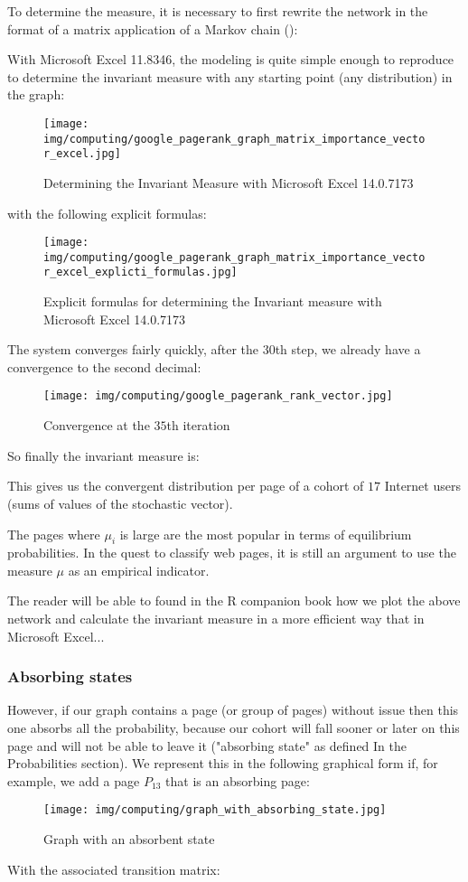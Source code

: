 	To determine the measure, it is necessary to first rewrite the network in the format of a matrix application of a Markov chain ():
	
	With Microsoft Excel 11.8346, the modeling is quite simple enough to reproduce to determine the invariant measure with any starting point (any distribution) in the graph:
	\begin{figure}[H]
		\centering
		\texttt{[image: img/computing/google\_pagerank\_graph\_matrix\_importance\_vector\_excel.jpg]}
		\caption[]{Determining the Invariant Measure with Microsoft Excel 14.0.7173}
	\end{figure}
	with the following explicit formulas:
	\begin{figure}[H]
		\centering
		\texttt{[image: img/computing/google\_pagerank\_graph\_matrix\_importance\_vector\_excel\_explicti\_formulas.jpg]}
		\caption[]{Explicit formulas for determining the Invariant measure with Microsoft Excel 14.0.7173}
	\end{figure}
	The system converges fairly quickly, after the $30$th step, we already have a convergence to the second decimal:
	\begin{figure}[H]
		\centering
		\texttt{[image: img/computing/google\_pagerank\_rank\_vector.jpg]}
		\caption[]{Convergence at the $35$th iteration}
	\end{figure}
	So finally the invariant measure is:
	
	This gives us the convergent distribution per page of a cohort of $17$ Internet users (sums of values of the stochastic vector).

	The pages where $\mu_i$ is large are the most popular in terms of equilibrium probabilities. In the quest to classify web pages, it is still an argument to use the measure $\mu$ as an empirical indicator.
	
	\begin{tcolorbox}[title=Remark,colframe=black,arc=10pt]
	The reader will be able to found in the R companion book how we plot the above network and calculate the invariant measure in a more efficient way that in Microsoft Excel...
	\end{tcolorbox}
	
	\subsubsection{Absorbing states}
	However, if our graph contains a page (or group of pages) without issue then this one absorbs all the probability, because our cohort will fall sooner or later on this page and will not be able to leave it ("absorbing state" as defined In the Probabilities section). We represent this in the following graphical form if, for example, we add a page $P_{13}$ that is an absorbing page:
	\begin{figure}[H]
		\centering
		\texttt{[image: img/computing/graph\_with\_absorbing\_state.jpg]}
		\caption{Graph with an absorbent state}
	\end{figure}
	With the associated transition matrix:
	\setcounter{MaxMatrixCols}{20}
	
